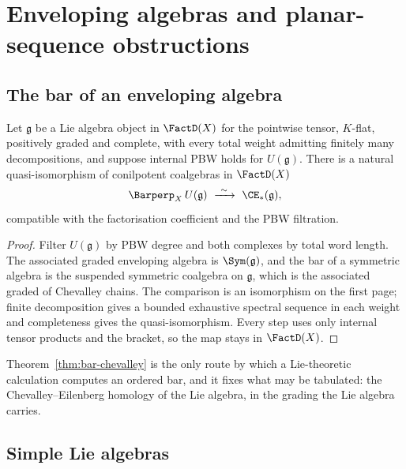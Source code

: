 \chapter{Enveloping algebras and planar-sequence obstructions}
\label{ch:enveloping-audit}

\section{The bar of an enveloping algebra}

\begin{theorem}
\label{thm:bar-chevalley}
\StatusProved{} Let $\mathfrak g$ be a Lie algebra object in $\FactD(X)$
for the pointwise tensor, $K$-flat, positively graded and complete, with
every total weight admitting finitely many decompositions, and suppose
internal PBW holds for $U(\mathfrak g)$. There is a natural
quasi-isomorphism of conilpotent coalgebras in $\FactD(X)$
\[
  \Barperp_X\,U(\mathfrak g)\ \xrightarrow{\ \sim\ }\ \CE_*(\mathfrak g),
\]
compatible with the factorisation coefficient and the PBW filtration.
\end{theorem}

\begin{proof}
Filter $U(\mathfrak g)$ by PBW degree and both complexes by total word
length. The associated graded enveloping algebra is $\Sym(\mathfrak g)$,
and the bar of a symmetric algebra is the suspended symmetric coalgebra on
$\mathfrak g$, which is the associated graded of Chevalley chains. The
comparison is an isomorphism on the first page; finite decomposition gives
a bounded exhaustive spectral sequence in each weight and completeness
gives the quasi-isomorphism. Every step uses only internal tensor products
and the bracket, so the map stays in $\FactD(X)$.
\end{proof}

Theorem~\ref{thm:bar-chevalley} is the only route by which a Lie-theoretic
calculation computes an ordered bar, and it fixes what may be tabulated:
the Chevalley--Eilenberg homology of the Lie algebra, in the grading the
Lie algebra carries.

\section{Simple Lie algebras}

